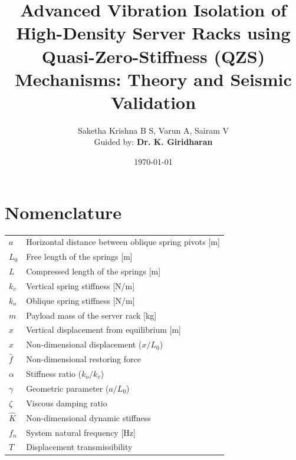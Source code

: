 \documentclass[preprint,12pt]{article}
\title{\textbf{Advanced Vibration Isolation of High-Density Server Racks using Quasi-Zero-Stiffness (QZS) Mechanisms: Theory and Seismic Validation}}
\author{Saketha Krishna B S, Varun A, Sairam V \\ \small Guided by: \textbf{Dr. K. Giridharan}}
\date{\today}
\begin{document}
\maketitle

\section*{Nomenclature}
\begin{tabular}{ll}
$a$ & Horizontal distance between oblique spring pivots [m] \\
$L_0$ & Free length of the springs [m] \\
$L$ & Compressed length of the springs [m] \\
$k_v$ & Vertical spring stiffness [N/m] \\
$k_o$ & Oblique spring stiffness [N/m] \\
$m$ & Payload mass of the server rack [kg] \\
$x$ & Vertical displacement from equilibrium [m] \\
$\hat{x}$ & Non-dimensional displacement ($x/L_0$) \\
$\hat{f}$ & Non-dimensional restoring force \\
$\alpha$ & Stiffness ratio ($k_o/k_v$) \\
$\gamma$ & Geometric parameter ($a/L_0$) \\
$\zeta$ & Viscous damping ratio \\
$\hat{K}$ & Non-dimensional dynamic stiffness \\
$f_n$ & System natural frequency [Hz] \\
$T$ & Displacement transmissibility \\
\end{tabular}
\end{document}
